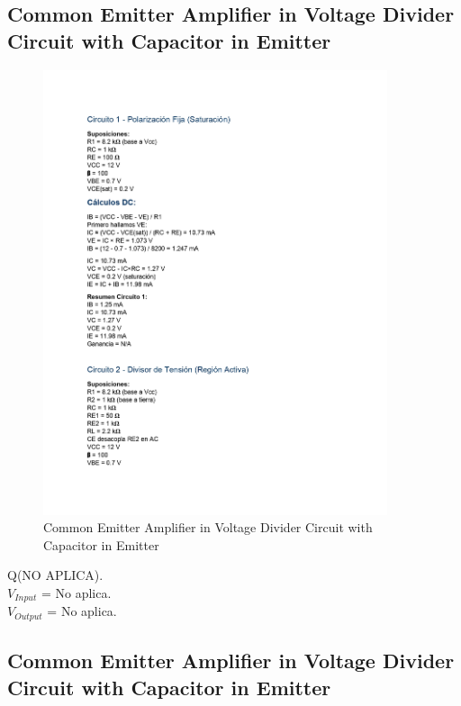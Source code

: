 \subsection{Common Emitter Amplifier in Voltage Divider Circuit with Capacitor in Emitter}

\begin{figure}[H]
    \centering
    \includegraphics[width = 0.9\textwidth]{Imagenes/Imagenes_Santiago/BJT1.jpg}
    \caption{Common Emitter Amplifier in Voltage Divider Circuit with Capacitor in Emitter}
    \label{circuit1Tteorico}
\end{figure}

\begin{center}
    Q(NO APLICA). \\
    \texorpdfstring{$V_{Input}$}{Vinput} = No aplica. \\
    \texorpdfstring{$V_{Output}$}{Voutput} = No aplica.
\end{center}

\subsection{Common Emitter Amplifier in Voltage Divider Circuit with Capacitor in Emitter}

